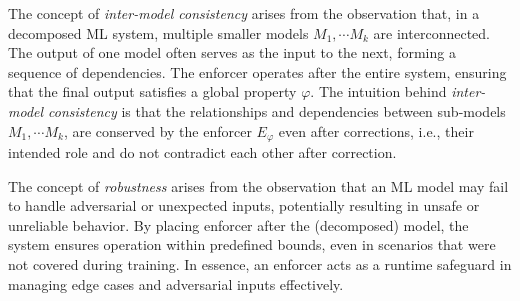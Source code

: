The concept of \textit{inter-model consistency} arises from the observation that, in a decomposed ML system, multiple smaller models $M_1,\cdots M_k$ are interconnected. The output of one model often serves as the input to the next, forming a sequence of dependencies. The enforcer operates after the entire system, ensuring that the final output satisfies a global property $\varphi$. The intuition behind \textit{inter-model consistency} is that the relationships and dependencies between sub-models $M_1,\cdots M_k$, are conserved by the enforcer $E_{\varphi}$ even after corrections, i.e., their intended role and do not contradict each other after correction.



The concept of \textit{robustness} arises from the observation that an ML model may fail to handle adversarial or unexpected inputs, potentially resulting in unsafe or unreliable behavior. By placing enforcer after the (decomposed) model, the system ensures operation within predefined bounds, even in scenarios that were not covered during training. In essence, an enforcer acts as a runtime safeguard in managing edge cases and adversarial inputs effectively.

